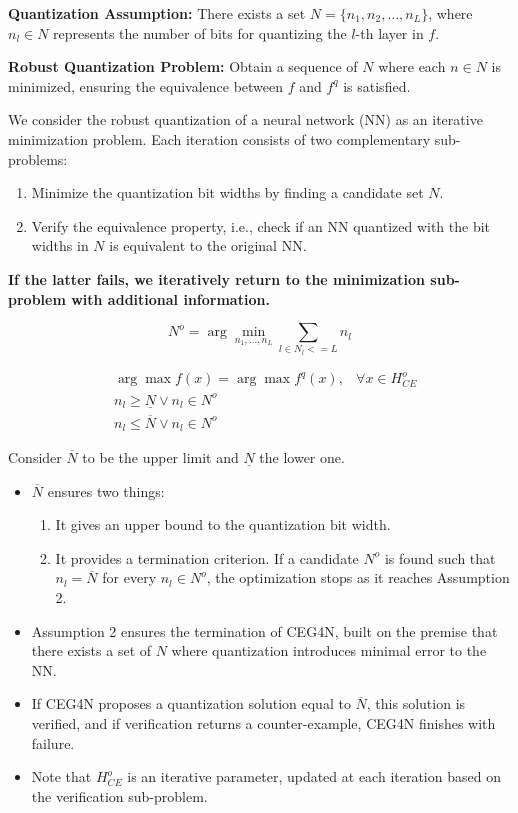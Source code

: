 \textbf{Quantization Assumption:}
There exists a set \( N = \{n_1, n_2, \ldots, n_L\} \), where \( n_l \in N \) represents the number of bits for quantizing the \( l \)-th layer in \( f \).

\textbf{Robust Quantization Problem:}
Obtain a sequence of \( N \) where each \( n \in N \) is minimized, ensuring the equivalence between \( f \) and \( f^q \) is satisfied.


We consider the robust quantization of a neural network (NN) as an iterative minimization problem. Each iteration consists of two complementary sub-problems:

\begin{enumerate}
  \item Minimize the quantization bit widths by finding a candidate set \( N \).
  \item Verify the equivalence property, i.e., check if an NN quantized with the bit widths in \( N \) is equivalent to the original NN.
\end{enumerate}

\textbf{If the latter fails, we iteratively return to the minimization sub-problem with additional information.}

\begin{equation}
    N^o = \arg\min_{n_1,...,n_L} \sum_{l \in N_l <= L} n_l 
\end{equation}
    
$$
\begin{aligned}
& \arg\max f(x) = \arg\max f^q(x), & \forall x \in H^o_{CE} \\
& n_l \geq \underline{N} \vee n_l  \in N^o \\
& n_l  \leq \overline{N}  \vee n_l  \in N^o 
\end{aligned}
$$
    

Consider \( \overline{N} \) to be the upper limit and \( \underline{N} \) the lower one.
\begin{itemize}
  \item \( \overline{N} \) ensures two things:
  \begin{enumerate}
    \item It gives an upper bound to the quantization bit width.
    \item It provides a termination criterion. If a candidate \( N^o \) is found such that \( n_l = \overline{N} \) for every \( n_l \in N^o \), the optimization stops as it reaches Assumption 2.
  \end{enumerate}
  \item Assumption 2 ensures the termination of CEG4N, built on the premise that there exists a set of \( N \) where quantization introduces minimal error to the NN.
  \item If CEG4N proposes a quantization solution equal to \( \overline{N} \), this solution is verified, and if verification returns a counter-example, CEG4N finishes with failure.
  \item Note that \( H^o_{CE} \) is an iterative parameter, updated at each iteration based on the verification sub-problem.
\end{itemize}

